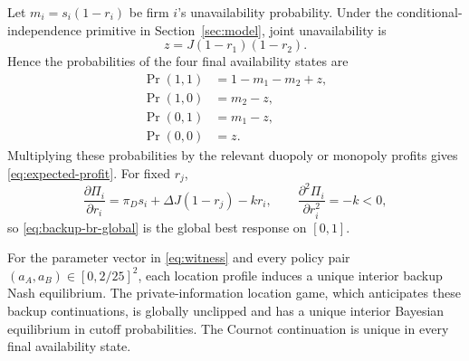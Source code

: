 Let $m_i=s_i(1-r_i)$ be firm $i$'s unavailability probability. Under the conditional-independence primitive in Section~\ref{sec:model}, joint unavailability is
\begin{equation}
z=J(1-r_1)(1-r_2).
\end{equation}
Hence the probabilities of the four final availability states are
\begin{align}
\Pr(1,1)&=1-m_1-m_2+z,\\
\Pr(1,0)&=m_2-z,\\
\Pr(0,1)&=m_1-z,\\
\Pr(0,0)&=z.
\end{align}
Multiplying these probabilities by the relevant duopoly or monopoly profits gives \eqref{eq:expected-profit}. For fixed $r_j$,
\begin{equation}
\frac{\partial\Pi_i}{\partial r_i}
=\pi_D s_i+\Delta J(1-r_j)-kr_i,
\qquad
\frac{\partial^2\Pi_i}{\partial r_i^2}=-k<0,
\end{equation}
so \eqref{eq:backup-br-global} is the global best response on $[0,1]$.

\begin{lemma}\label{lem:continuation}
For the parameter vector in \eqref{eq:witness} and every policy pair $(a_A,a_B)\in[0,2/25]^2$, each location profile induces a unique interior backup Nash equilibrium. The private-information location game, which anticipates these backup continuations, is globally unclipped and has a unique interior Bayesian equilibrium in cutoff probabilities. The Cournot continuation is unique in every final availability state.
\end{lemma}

